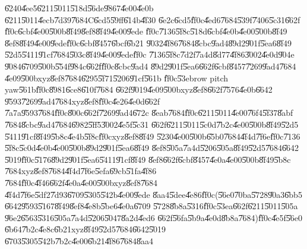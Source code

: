 \U{6240}\U{4ee5}\U{6211}\U{5011}\U{518d}\U{56de}\U{9867}\U{4e00}\U{4e0b}%
\U{6211}\U{5011}\U{4ecb}\U{7d39}\U{7684}C\U{6cd5}\U{59ff}\U{614b}\U{4f30}%
\U{6e2c}\U{6cd5}\U{ff0c}\U{4ed6}\U{7684}\U{539f}\U{7406}\U{5c31}\U{662f}%
\U{ff0c}\U{6cbf}\U{4e00}\U{500b}\U{8f49}\U{8ef8}\U{8f49}\U{4e00}\U{9ede}%
\U{ff0c}\U{7136}\U{5f8c}\U{518d}\U{6cbf}\U{4e0b}\U{4e00}\U{500b}\U{8f49}%
\U{8ef8}\U{8f49}\U{4e00}\U{9ede}\U{ff0c}\U{6cbf}\U{8457}\U{6bcf}\U{6b21}%
\U{9032}\U{4f86}\U{7684}\U{8cbc}\U{9ad4}\U{89d2}\U{901f}\U{5ea6}\U{8f49}%
\U{52d5}\U{5411}\U{91cf}\U{7684}\U{503c}\U{8f49}\U{4e00}\U{9ede}\U{ff0c}%
\U{7136}\U{5f8c}\U{7d2f}\U{7a4d}\U{8d77}\U{4f86}\U{3002}\U{4e0d}\U{904e}%
\U{9084}\U{6709}\U{500b}\U{554f}\U{984c}\U{662f}\U{ff0c}\U{8cbc}\U{9ad4}%
\U{89d2}\U{901f}\U{5ea6}\U{662f}\U{6cbf}\U{8457}\U{7269}\U{9ad4}\U{7684}%
\U{4e09}\U{500b}xyz\U{8ef8}\U{7684}\U{6295}\U{5f71}\U{5206}\U{91cf}\U{561b}%
\U{ff0c}\U{53eb}row pitch yaw\U{561b}\U{ff0c}\U{8981}\U{6ce8}\U{610f}\U{7684}%
\U{662f}\U{9019}\U{4e09}\U{500b}xyz\U{8ef8}\U{662f}\U{7576}\U{4e0b}\U{6642}%
\U{9593}\U{7269}\U{9ad4}\U{7684}xyz\U{8ef8}\U{ff0c}\U{4e26}\U{4e0d}\U{662f}%
\U{7a7a}\U{9593}\U{7684}\U{ff0c}\U{800c}\U{662f}\U{7269}\U{9ad4}\U{672c}%
\U{8eab}\U{7684}\U{ff0c}\U{6211}\U{5011}\U{4e00}\U{76f4}\U{5f37}\U{8abf}%
\U{7684}\U{8cbc}\U{9ad4}\U{7684}\U{6982}\U{5ff5}\U{3002}\U{4e5f}\U{5c31}%
\U{662f}\U{6211}\U{5011}\U{5c0d}\U{7b2c}\U{4e00}\U{500b}\U{8f49}\U{52d5}%
\U{5411}\U{91cf}\U{8f49}\U{5b8c}\U{4e4b}\U{5f8c}\U{ff0c}xyz\U{8ef8}\U{8f49}%
\U{5230}\U{4e00}\U{500b}\U{65b0}\U{7684}\U{4f4d}\U{7f6e}\U{ff0c}\U{7136}%
\U{5f8c}\U{5c0d}\U{4e0b}\U{4e00}\U{500b}\U{89d2}\U{901f}\U{5ea6}\U{8f49}%
\U{8ef8}\U{505a}\U{7a4d}\U{5206}\U{505a}\U{8f49}\U{52d5}\U{7684}\U{6642}%
\U{5019}\U{ff0c}\U{5176}\U{89d2}\U{901f}\U{5ea6}\U{5411}\U{91cf}\U{8f49}%
\U{8ef8}\U{662f}\U{6cbf}\U{8457}\U{4e0a}\U{4e00}\U{500b}\U{8f49}\U{5b8c}%
\U{7684}xyz\U{8ef8}\U{7684}\U{4f4d}\U{7f6e}\U{5efa}\U{69cb}\U{51fa}\U{4f86}%
\U{7684}\U{ff0c}\U{4f46}\U{662f}\U{4e0a}\U{4e00}\U{500b}xyz\U{8ef8}\U{7684}%
\U{4f4d}\U{7f6e}\U{5df2}\U{7d93}\U{6709}\U{5305}\U{542b}\U{4e00}\U{9ede}%
\U{8aa4}\U{5dee}\U{4e86}\U{ff0c}(\U{56e0}\U{70ba}\U{5728}\U{90a3}\U{6bb5}%
\U{6642}\U{9593}\U{5167}\U{8f49}\U{8ef8}\U{4e8b}\U{5be6}\U{4e0a}\U{6709}%
\U{5728}\U{8b8a}\U{5316}\U{ff0c}\U{53ea}\U{662f}\U{6211}\U{5011}\U{505a}%
\U{96e2}\U{6563}\U{5316}\U{505a}\U{7a4d}\U{5206}\U{5047}\U{8a2d}\U{4ed6}%
\U{662f}\U{56fa}\U{5b9a}\U{4e0d}\U{8b8a}\U{7684})\U{ff0c}\U{4e5f}\U{56e0}%
\U{6b64}\U{7b2c}\U{4e8c}\U{6b21}xyz\U{8f49}\U{52d5}\U{7684}\U{6642}\U{5019}%
\U{6703}\U{5305}\U{542b}\U{7b2c}\U{4e00}\U{6b21}\U{4f86}\U{7684}\U{8aa4}%
